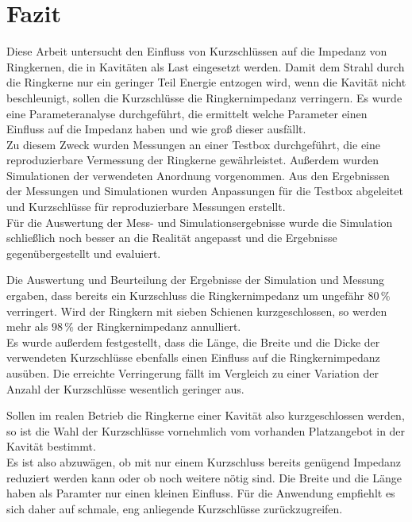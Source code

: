 \section{Fazit}
Diese Arbeit untersucht den Einfluss von Kurzschlüssen auf die Impedanz von Ringkernen, die in Kavitäten als Last eingesetzt werden. Damit dem Strahl durch die Ringkerne nur ein geringer Teil Energie entzogen wird, wenn die Kavität nicht beschleunigt, sollen die Kurzschlüsse die Ringkernimpedanz verringern. Es wurde eine Parameteranalyse durchgeführt, die ermittelt welche Parameter einen Einfluss auf die Impedanz haben und wie groß dieser ausfällt.\\
Zu diesem Zweck wurden Messungen an einer Testbox durchgeführt, die eine reproduzierbare Vermessung der Ringkerne gewährleistet. Außerdem wurden Simulationen der verwendeten Anordnung vorgenommen. Aus den Ergebnissen der Messungen und Simulationen wurden Anpassungen für die Testbox abgeleitet und Kurzschlüsse für reproduzierbare Messungen erstellt.\\
Für die Auswertung der Mess- und Simulationsergebnisse wurde die Simulation schließlich noch besser an die Realität angepasst und die Ergebnisse gegenübergestellt und evaluiert.
\par
Die Auswertung und Beurteilung der Ergebnisse der Simulation und Messung ergaben, dass bereits ein Kurzschluss die Ringkernimpedanz um ungefähr $80\,\%$ verringert. Wird der Ringkern mit sieben Schienen kurzgeschlossen, so werden mehr als $98\,\%$ der Ringkernimpedanz annulliert.\\
Es wurde außerdem festgestellt, dass die Länge, die Breite und die Dicke der verwendeten Kurzschlüsse ebenfalls einen Einfluss auf die Ringkernimpedanz ausüben. Die erreichte Verringerung fällt im Vergleich zu einer Variation der Anzahl der Kurzschlüsse wesentlich geringer aus.
\par
Sollen im realen Betrieb die Ringkerne einer Kavität also kurzgeschlossen werden, so ist die Wahl der Kurzschlüsse vornehmlich vom vorhanden Platzangebot in der Kavität bestimmt.\\
Es ist also abzuwägen, ob mit nur einem Kurzschluss bereits genügend Impedanz reduziert werden kann oder ob noch weitere nötig sind. Die Breite und die Länge haben als Paramter nur einen kleinen Einfluss. Für die Anwendung empfiehlt es sich daher auf schmale, eng anliegende Kurzschlüsse zurückzugreifen. 
\par

